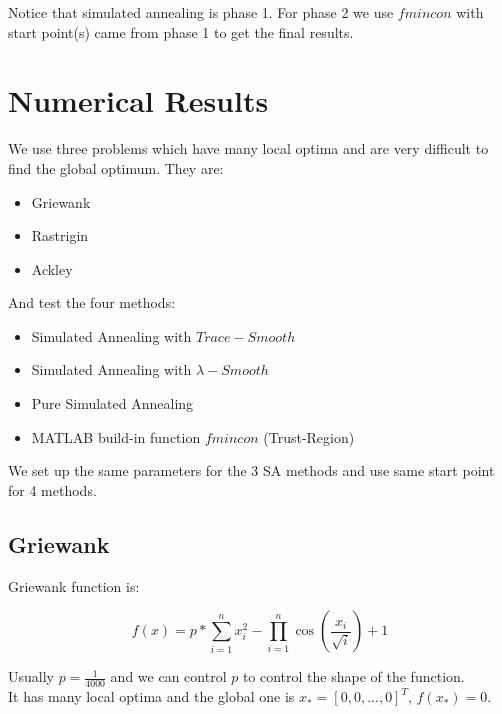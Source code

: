 \documentclass[letterpaper,12pt,titlepage,oneside,final]{book}
\begin{document}
Notice that simulated annealing is phase 1. For phase 2 we use $fmincon$ with start point(s) came from phase 1 to get the final results.

\chapter{Numerical Results}

We use three problems which have many local optima and are very difficult to find the global optimum. They are:

\begin{itemize}

\item Griewank

\item Rastrigin

\item Ackley

\end{itemize}

And test the four methods:

\begin{itemize}

\item Simulated Annealing with $Trace-Smooth$

\item Simulated Annealing with $\lambda-Smooth$

\item Pure Simulated Annealing

\item MATLAB build-in function $fmincon$ (Trust-Region)

\end{itemize}

We set up the same parameters for the 3 SA methods and use same start point for 4 methods.

\section{Griewank}

Griewank function is:

\begin{equation}
f(x)=p* \sum_{i=1}^n x_i^2-\prod_{i=1}^n \cos \left(\frac{x_i}{\sqrt{i}}\right)+1
\end{equation}

Usually $p=\frac{1}{4000}$ and we can control $p$ to control the shape of the function.\\
It has many local optima and the global one is $x_*=[0,0,...,0]^T$, $f(x_*)=0$.
\end{document}
